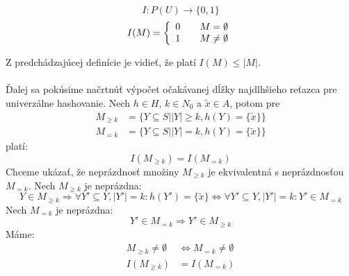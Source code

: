 \begin{definition}[Indikátor]
\begin{displaymath}
I: P(U) \rightarrow \lbrace 0, 1 \rbrace
\end{displaymath}
\begin{displaymath}
I(M) = \left\{ 
\begin{array}{l l}
  0 & \quad M = \emptyset \\
  1 & \quad M \neq \emptyset \\
\end{array} \right.
\end{displaymath}
\end{definition}

Z predchádzajúcej definície je vidieť, že platí $I(M) \leq |M|$.

\paragraph{}
Ďalej sa pokúsime načrtnúť výpočet očakávanej dĺžky najdlhšieho reťazca pre univerzálne hashovanie. Nech $h \in H$, $k \in N_0$ a $\tilde{x} \in A$, potom pre
\begin{displaymath}
\begin{split}
M_{\geq k} & = \{Y \subseteq S | |Y| \geq k, h(Y) = \{\tilde{x}\}\} \\
M_{= k} & = \{Y \subseteq S | |Y| = k, h(Y) = \{\tilde{x}\}\} 
\end{split}
\end{displaymath}
platí:
\begin{displaymath}
I(M_{\geq k}) = I(M_{= k})
\end{displaymath}
Chceme ukázať, že neprázdnosť množiny $M_{\geq k}$ je ekvivalentná s neprázdnosťou $M_{= k}$. Nech $M_{\geq k}$ je neprázdna:
\begin{displaymath}
Y \in M_{\geq k} \Rightarrow \forall Y' \subseteq Y, |Y'| = k: h(Y') = \{\tilde{x}\} \Leftrightarrow \forall Y' \subseteq Y, |Y'| = k: Y' \in M_{=k}
\end{displaymath}
Nech $M_{=k}$ je neprázdna:
\begin{displaymath}
Y' \in M_{=k} \Rightarrow Y' \in M_{\geq k}
\end{displaymath}
Máme:
\begin{displaymath}
\begin{split}
M_{\geq k} \neq \emptyset & \Leftrightarrow  M_{= k} \neq \emptyset \\
I(M_{\geq k}) & = I(M_{= k})
\end{split}
\end{displaymath}

